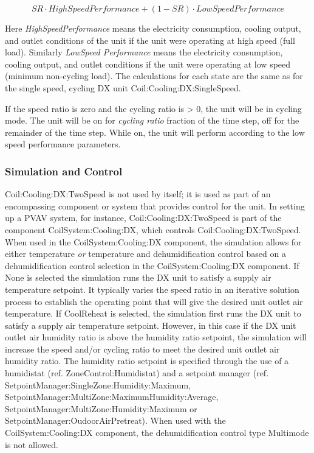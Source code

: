 \begin{equation}
SR\cdot HighSpeedPerformance + (1 - SR)\cdot LowSpeedPerformance
\end{equation}

Here \emph{HighSpeedPerformance} means the electricity consumption, cooling output, and outlet conditions of the unit if the unit were operating at high speed (full load). Similarly \emph{LowSpeed Performance} means the electricity consumption, cooling output, and outlet conditions if the unit were operating at low speed (minimum non-cycling load). The calculations for each state are the same as for the single speed, cycling DX unit Coil:Cooling:DX:SingleSpeed.

If the speed ratio is zero and the cycling ratio is \textgreater{} 0, the unit will be in cycling mode. The unit will be on for \emph{cycling ratio} fraction of the time step, off for the remainder of the time step. While on, the unit will perform according to the low speed performance parameters.

\subsubsection{Simulation and Control}\label{simulation-and-control-001}

Coil:Cooling:DX:TwoSpeed is not used by itself; it is used as part of an encompassing component or system that provides control for the unit. In setting up a PVAV system, for instance, Coil:Cooling:DX:TwoSpeed is part of the component CoilSystem:Cooling:DX, which controls Coil:Cooling:DX:TwoSpeed. When used in the CoilSystem:Cooling:DX component, the simulation allows for either temperature \emph{or} temperature and dehumidification control based on a dehumidification control selection in the CoilSystem:Cooling:DX component. If None is selected the simulation runs the DX unit to satisfy a supply air temperature setpoint. It typically varies the speed ratio in an iterative solution process to establish the operating point that will give the desired unit outlet air temperature. If CoolReheat is selected, the simulation first runs the DX unit to satisfy a supply air temperature setpoint. However, in this case if the DX unit outlet air humidity ratio is above the humidity ratio setpoint, the simulation will increase the speed and/or cycling ratio to meet the desired unit outlet air humidity ratio. The humidity ratio setpoint is specified through the use of a humidistat (ref. ZoneControl:Humidistat) and a setpoint manager (ref. SetpointManager:SingleZone:Humidity:Maximum, SetpointManager:MultiZone:MaximumHumidity:Average,~ SetpointManager:MultiZone:Humidity:Maximum or SetpointManager:OudoorAirPretreat). When used with the CoilSystem:Cooling:DX component, the dehumidification control type Multimode is not allowed.

